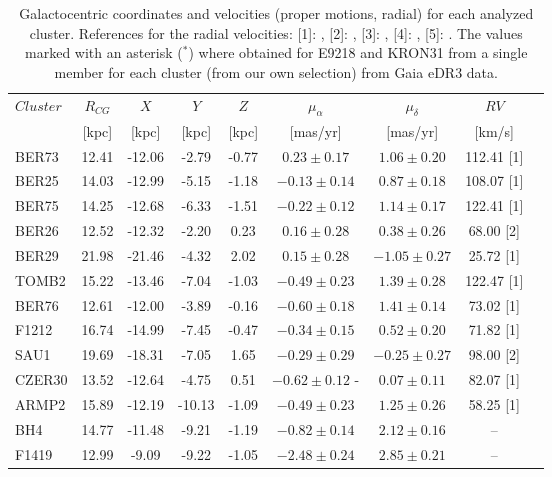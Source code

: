 \documentclass[draft]{aa}
\begin{document}
\begin{appendix}
  \begin{table}
   \caption{Galactocentric coordinates and velocities (proper motions, radial)
   for each analyzed cluster. References for the radial velocities: [1]: 
   \cite{Tarricq_2021}, [2]: \cite{Dias_2002}, [3]: \cite{Soubiran_2018}, [4]: 
   \cite{Dias_2007}, [5]: \cite{Frinchaboy_2006}. The values marked with an
   asterisk ($^*$) where obtained for E9218 and KRON31 from a single member for
   each cluster (from our own selection) from Gaia eDR3 data.}
   \label{tab:velocities}
   \centering
   \renewcommand{\arraystretch}{1.3}
   \begin{tabular}{lcccccccc}
    \hline \hline
    $Cluster$ & $R_{CG}$ & $X$ & $Y$ & $Z$ & $\mu_{\alpha}$ & $\mu_{\delta}$ & $RV$\\
     & [kpc] & [kpc] & [kpc] & [kpc] & [mas/yr] & [mas/yr] & [km/s]\\
    \hline
    BER73 & 12.41 & -12.06  & -2.79 & -0.77 & $0.23 \pm 0.17$ & $1.06 \pm 0.20$ & 112.41  [1]\\
    BER25 & 14.03 & -12.99  & -5.15 & -1.18 & $-0.13  \pm 0.14$ & $0.87 \pm 0.18$ & 108.07  [1]\\
    BER75 & 14.25 & -12.68  & -6.33 & -1.51 & $-0.22  \pm 0.12$ & $1.14 \pm 0.17$ & 122.41  [1]\\
    BER26 & 12.52 & -12.32  & -2.20 & 0.23  & $0.16 \pm 0.28$ & $0.38 \pm 0.26$ & 68.00 [2]\\
    BER29 & 21.98 & -21.46  & -4.32 & 2.02  & $0.15 \pm 0.28$ & $-1.05  \pm 0.27$ & 25.72 [1]\\
    TOMB2 & 15.22 & -13.46  & -7.04 & -1.03 & $-0.49  \pm 0.23$ & $1.39 \pm 0.28$ & 122.47  [1]\\
    BER76 & 12.61 & -12.00  & -3.89 & -0.16 & $-0.60  \pm 0.18$ & $1.41 \pm 0.14$ & 73.02 [1]\\
    F1212 & 16.74 & -14.99  & -7.45 & -0.47 & $-0.34  \pm 0.15$ & $0.52 \pm 0.20$ & 71.82 [1]\\
    SAU1  & 19.69 & -18.31  & -7.05 & 1.65  & $-0.29  \pm 0.29$ & $-0.25  \pm 0.27$ & 98.00 [2]\\
    CZER30  & 13.52 & -12.64  & -4.75 & 0.51  & $-0.62  \pm 0.12$ -&  $0.07 \pm 0.11$ & 82.07 [1]\\
    ARMP2 & 15.89 & -12.19  & -10.13  & -1.09 & $-0.49  \pm 0.23$ & $1.25 \pm 0.26$ & 58.25 [1]\\
    BH4 & 14.77 & -11.48  & -9.21 & -1.19 & $-0.82  \pm 0.14$ & $2.12\pm0.16$ & --  \\
    F1419 & 12.99 & -9.09 & -9.22 & -1.05 & $-2.48  \pm 0.24$ & $2.85 \pm 0.21$ & --\\  

\end{tabular}
\end{table}
\end{appendix}
\end{document}
